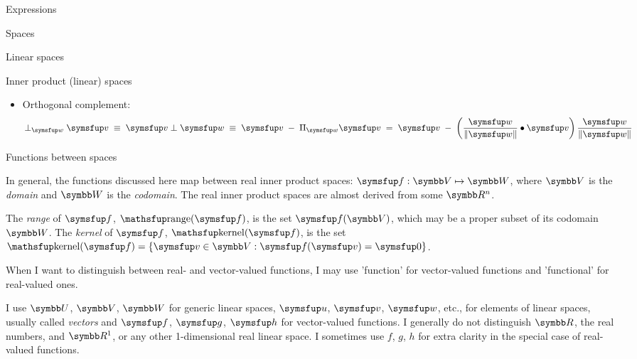 \documentclass{PalisadesLakesArticle}
\begin{document}
\begin{plSection}{Expressions}
\begin{plSection}{Spaces}
\begin{plSection}{Linear spaces}
\begin{plSection}{Inner product (linear) spaces}
\begin{itemize}
\item Orthogonal complement:
\begin{equation}
\perp_{\Vector{w}} \Vector{v}
\; \equiv \;
\Vector{v} \perp \Vector{w}
\; \equiv \;
\Vector{v} \; - \; \Projection_{\Vector{w}} \Vector{v}
\; = \;
\Vector{v} \; - \; 
\left( 
\frac{\Vector{w}}{\|\Vector{w}\|} \bullet \Vector{v} 
\right) 
\frac{\Vector{w}}{\|\Vector{w}\|}
\end{equation}

\end{itemize}
\end{plSection}%
\end{plSection}%
\begin{plSection}{Functions between spaces}
\label{sec:Functions-between-spaces}

In general, the functions discussed here map between real inner product spaces:
$\Vector{f}:\Space{V} \mapsto \Space{W}$, where $\Space{V}$ is the
\textit{domain} and $\Space{W}$ is the \textit{codomain}.
The real inner product spaces are almost derived from some $\Reals^n$.

The \textit{range} of 
$\Vector{f}$, $\range(\Vector{f})$, is the set $\Vector{f}(\Space{V})$,
which may be a proper subset of its codomain $\Space{W}$.
The \textit{kernel} of
 $\Vector{f}$, $\kernel(\Vector{f})$, is the set
$\kernel(\Vector{f}) = \left\{ \Vector{v} \in \Space{V}
 : \Vector{f}(\Vector{v}) = \Vector{0} \right\}$.

When I want to distinguish between real- and vector-valued functions,
I may use 'function' for vector-valued functions and
'functional' for real-valued ones.

I use $\Space{U}$, $\Space{V}$, $\Space{W}$ for generic linear spaces,
$\Vector{u}$, $\Vector{v}$, $\Vector{w}$, etc., for elements of linear spaces,
usually called \textit{vectors}
and
$\Vector{f}$, $\Vector{g}$, $\Vector{h}$ for vector-valued functions.
I generally do not distinguish $\Reals$, the real numbers,
and $\Reals^1$, or any other 1-dimensional real linear space.
I sometimes use $f$, $g$, $h$ for extra clarity in the special
case of real-valued functions.


\end{plSection}
\end{plSection}
\end{plSection}
\end{document}
